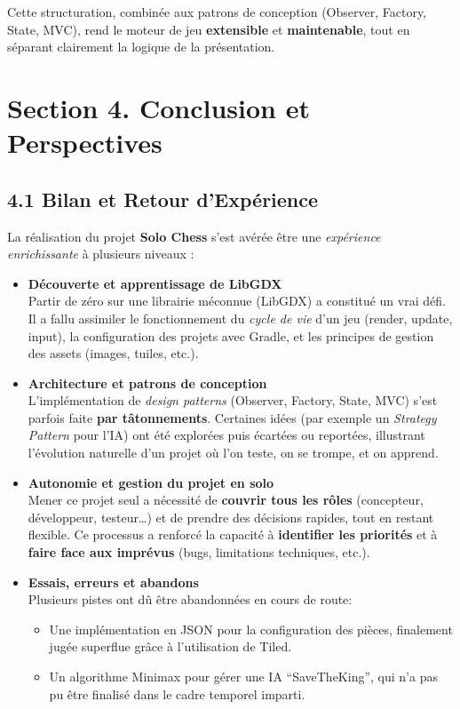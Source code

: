 \documentclass[11pt,a4paper]{article}
\begin{document}
Cette structuration, combinée aux patrons de conception (Observer, Factory, State, MVC), rend le moteur de jeu \textbf{extensible} et \textbf{maintenable}, tout en séparant clairement la logique de la présentation.

\section*{Section 4. Conclusion et Perspectives}

\subsection*{4.1 Bilan et Retour d’Expérience}

La réalisation du projet \textbf{Solo Chess} s’est avérée être une \emph{expérience enrichissante} à plusieurs niveaux :

\begin{itemize}[leftmargin=1.5em]
    \item \textbf{Découverte et apprentissage de LibGDX}\\
    Partir de zéro sur une librairie méconnue (LibGDX) a constitué un vrai défi. Il a fallu assimiler le fonctionnement du \emph{cycle de vie} d’un jeu (render, update, input), la configuration des projets avec Gradle, et les principes de gestion des assets (images, tuiles, etc.).

    \item \textbf{Architecture et patrons de conception}\\
    L’implémentation de \emph{design patterns} (Observer, Factory, State, MVC) s’est parfois faite \textbf{par tâtonnements}. Certaines idées (par exemple un \emph{Strategy Pattern} pour l’IA) ont été explorées puis écartées ou reportées, illustrant l’évolution naturelle d’un projet où l’on teste, on se trompe, et on apprend.

    \item \textbf{Autonomie et gestion du projet en solo}\\
    Mener ce projet seul a nécessité de \textbf{couvrir tous les rôles} (concepteur, développeur, testeur…) et de prendre des décisions rapides, tout en restant flexible. Ce processus a renforcé la capacité à \textbf{identifier les priorités} et à \textbf{faire face aux imprévus} (bugs, limitations techniques, etc.).

    \item \textbf{Essais, erreurs et abandons}\\
    Plusieurs pistes ont dû être abandonnées en cours de route:
    \begin{itemize}
        \item Une implémentation en JSON pour la configuration des pièces, finalement jugée superflue grâce à l’utilisation de Tiled.
        \item Un algorithme Minimax pour gérer une IA “SaveTheKing”, qui n’a pas pu être finalisé dans le cadre temporel imparti.
    \end{itemize}

\end{itemize}
\end{document}
